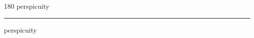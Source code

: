 
\begin{frame}
\begin{center}
\begin{turn}{180}
{\fontsize{2.5cm}{1em}\selectfont perspicuity}
\end{turn}
\vspace{1em}\par  
\hrule
\vspace{1em}\par  
{\fontsize{2.5cm}{1em}\selectfont perspicuity}
\end{center}
\end{frame}
